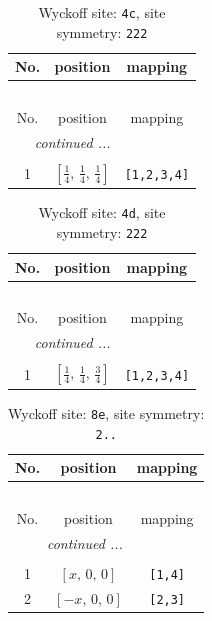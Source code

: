 \documentclass[fleqn,8pt]{jsarticle}
\begin{document}
\begin{longtable}{ccc}
\caption{Wyckoff site: {\tt 4c}, site symmetry: {\tt 222}}
 \\
 \hline \hline
No. & position & mapping \\ \hline \endfirsthead

\multicolumn{2}{l}{\tablename\ \thetable{}} \\
 \hline \hline
No. & position & mapping \\ \hline \endhead

 \hline \hline
\multicolumn{2}{r}{\footnotesize\it continued ...} \\ \endfoot

 \hline \hline
\multicolumn{2}{r}{} \\ \endlastfoot

1 & $\left[ \frac{1}{4},\, \frac{1}{4},\, \frac{1}{4} \right]$ & {\tt [1,2,3,4]} \\
\end{longtable}
\renewcommand{\arraystretch}{1.2}
\begin{longtable}{ccc}
\caption{Wyckoff site: {\tt 4d}, site symmetry: {\tt 222}}
 \\
 \hline \hline
No. & position & mapping \\ \hline \endfirsthead

\multicolumn{2}{l}{\tablename\ \thetable{}} \\
 \hline \hline
No. & position & mapping \\ \hline \endhead

 \hline \hline
\multicolumn{2}{r}{\footnotesize\it continued ...} \\ \endfoot

 \hline \hline
\multicolumn{2}{r}{} \\ \endlastfoot

1 & $\left[ \frac{1}{4},\, \frac{1}{4},\, \frac{3}{4} \right]$ & {\tt [1,2,3,4]} \\
\end{longtable}
\renewcommand{\arraystretch}{1.2}
\begin{longtable}{ccc}
\caption{Wyckoff site: {\tt 8e}, site symmetry: {\tt 2..}}
 \\
 \hline \hline
No. & position & mapping \\ \hline \endfirsthead

\multicolumn{2}{l}{\tablename\ \thetable{}} \\
 \hline \hline
No. & position & mapping \\ \hline \endhead

 \hline \hline
\multicolumn{2}{r}{\footnotesize\it continued ...} \\ \endfoot

 \hline \hline
\multicolumn{2}{r}{} \\ \endlastfoot

1 & $\left[ x,\, 0,\, 0 \right]$ & {\tt [1,4]} \\ \hline
2 & $\left[ - x,\, 0,\, 0 \right]$ & {\tt [2,3]} \\
\end{longtable}
\end{document}
